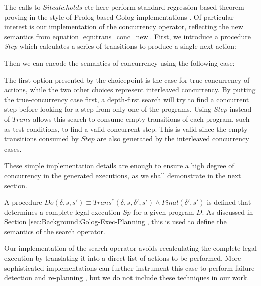

The calls to $Sitcalc.holds$ etc here perform standard regression-based
theorem proving in the style of Prolog-based Golog implementations
\citep{levesque97golog,giacomo00congolog}. Of particular interest
is our implementation of the concurrency operator, reflecting the
new semantics from equation \eqref{eqn:trans_conc_new}. First, we
introduce a procedure \emph{Step} which calculates a series of transitions
to produce a single next action:


Then we can encode the semantics of concurrency using the following
case:


The first option presented by the choicepoint is the case for true
concurrency of actions, while the two other choices represent interleaved
concurrency. By putting the true-concurrency case first, a depth-first
search will try to find a concurrent step before looking for a step
from only one of the programs. Using $Step$ instead of $Trans$ allows
this search to consume empty transitions of each program, such as
test conditions, to find a valid concurrent step. This is valid since
the empty transitions consumed by $Step$ are also generated by the
interleaved concurrency cases.

These simple implementation details are enough to ensure a high degree
of concurrency in the generated executions, as we shall demonstrate
in the next section.

A procedure $Do(\delta,s,s')\equiv Trans^{*}(\delta,s,\delta',s')\wedge Final(\delta',s')$
is defined that determines a complete legal execution $Sp$ for a
given program $D$. As discussed in Section \ref{sec:Background:Golog-Exec-Planning},
this is used to define the semantics of the search operator.


Our implementation of the search operator avoids recalculating the
complete legal execution by translating it into a direct list of actions
to be performed. More sophisticated implementations can further instrument
this case to perform failure detection and re-planning \citep{Lesperance00improved_indigolog},
but we do not include these techniques in our work.

